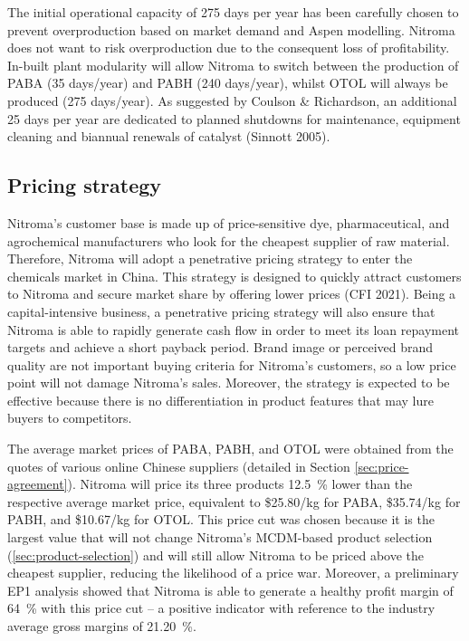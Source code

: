 The initial operational capacity of 275 days per year has been carefully chosen to prevent overproduction based on market demand and Aspen modelling. Nitroma does not want to risk overproduction due to the consequent loss of profitability. In-built plant modularity will allow Nitroma to switch between the production of PABA (35 days/year) and PABH (240 days/year), whilst OTOL will always be produced (275 days/year). As suggested by Coulson \& Richardson, an additional 25 days per year are dedicated to planned shutdowns for maintenance, equipment cleaning and biannual renewals of catalyst (Sinnott 2005). 

\subsection{Pricing strategy}
\label{sec:pricing-strategy}
Nitroma’s customer base is made up of price-sensitive dye, pharmaceutical, and agrochemical manufacturers who look for the cheapest supplier of raw material. Therefore, Nitroma will adopt a penetrative pricing strategy to enter the chemicals market in China. This strategy is designed to quickly attract customers to Nitroma and secure market share by offering lower prices (CFI 2021). Being a capital-intensive business, a penetrative pricing strategy will also ensure that Nitroma is able to rapidly generate cash flow in order to meet its loan repayment targets and achieve a short payback period. Brand image or perceived brand quality are not important buying criteria for Nitroma’s customers, so a low price point will not damage Nitroma’s sales. Moreover, the strategy is expected to be effective because there is no differentiation in product features that may lure buyers to competitors.

The average market prices of PABA, PABH, and OTOL were obtained from the quotes of various online Chinese suppliers (detailed in Section \ref{sec:price-agreement}).  Nitroma will price its three products \SI{12.5}{\percent} lower than the respective average market price, equivalent to \$25.80/kg for PABA, \$35.74/kg for PABH, and \$10.67/kg for OTOL. This price cut was chosen because it is the largest value that will not change Nitroma’s MCDM-based product selection (\cref{sec:product-selection}) and will still allow Nitroma to be priced above the cheapest supplier, reducing the likelihood of a price war. Moreover, a preliminary EP1 analysis showed that Nitroma is able to generate a healthy profit margin of \SI{64}{\percent} with this price cut – a positive indicator with reference to the industry average gross margins of \SI{21.20}{\percent}. 

